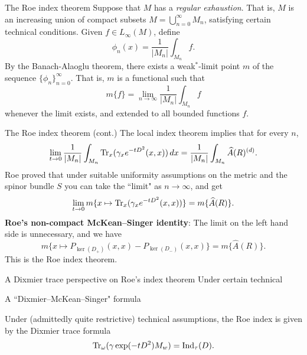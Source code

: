 \documentclass{beamer}
\numberwithin{equation}{section}
\theoremstyle{plain}
\theoremstyle{plain}
\theoremstyle{definition}
\theoremstyle{plain}
\theoremstyle{plain}
\theoremstyle{definition}
\newcommand{\tr}{{\rm Tr}}
\begin{document}
\begin{frame}{The Roe index theorem}
    Suppose that $M$ has a \emph{regular exhaustion}. That is, $M$ is an increasing union of compact subsets $M = \bigcup_{n=0}^\infty M_n$, satisfying certain technical conditions.
    Given $f\in L_\infty(M)$, define
    \begin{equation*}
        \phi_n(x) = \frac{1}{|M_n|}\int_{M_n} f.
    \end{equation*}
    By the Banach-Alaoglu theorem, there exists a weak$^*$-limit point $m$ of the sequence $\{\phi_n\}_{n=0}^\infty$. That is, $m$ is a functional such that
    \begin{equation*}
        m\{f\} = \lim_{n\to\infty} \frac{1}{|M_n|} \int_{M_n} f
    \end{equation*}
    whenever the limit exists, and extended to all bounded functions $f$.
\end{frame}

\begin{frame}{The Roe index theorem (cont.)}
    The local index theorem implies that for every $n$,
    \begin{equation*}
        \lim_{t\to 0} \frac{1}{|M_n|}\int_{M_n}\tr_x(\gamma_xe^{-tD^2}(x,x))\,dx = \frac{1}{|M_n|}\int_{M_n} \widehat{A}(R)^{(d)}.
    \end{equation*}
    Roe proved that under suitable uniformity assumptions on the metric and the spinor bundle $S$ you can take the ``limit" as $n\to\infty$, and get
    \begin{equation*}
        \lim_{t\to 0} m\{x\mapsto \tr_x(\gamma_xe^{-tD^2}(x,x))\} = m\{\widehat{A}(R)\}.
    \end{equation*}
    \pause
    \textbf{Roe's non-compact McKean--Singer identity}: The limit on the left hand side is unnecessary, and we have
    \begin{equation*}
        m\{x\mapsto P_{\ker(D_+)}(x,x)-P_{\ker(D_-)}(x,x)\} = m\{\widehat{A}(R)\}.
    \end{equation*}
    This is the Roe index theorem. 
\end{frame}

\begin{frame}{A Dixmier trace perspective on Roe's index theorem}
    Under certain technical 
\end{frame}


\begin{frame}{A ``Dixmier--McKean--Singer" formula}
    \begin{theorem}[Hekkelman-M. (2023)]
        Under (admittedly quite restrictive) technical assumptions, the Roe index is given by the Dixmier trace formula
        \begin{equation*}
            \tr_{\omega}(\gamma\exp(-tD^2)M_w) = \mathrm{Ind}_{\tau}(D).
        \end{equation*}
    \end{theorem}
\end{frame}

\begin{frame}
\end{frame}
\end{document}

